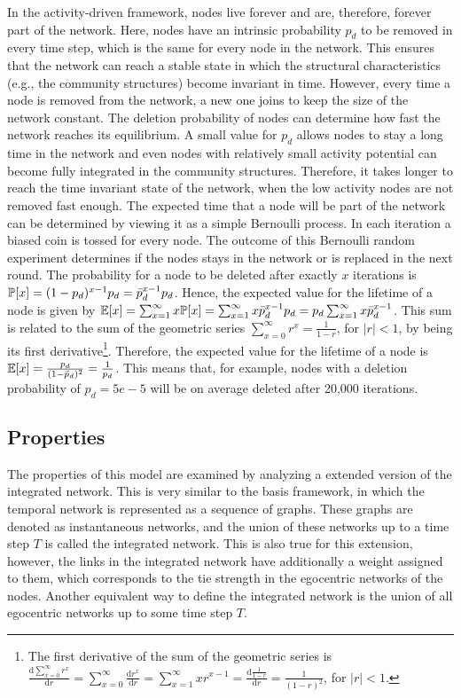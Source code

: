 In the activity-driven framework, nodes live forever and are, therefore, forever part of the network.
Here, nodes have an intrinsic probability \(p_{d}\) to be removed in every time step, which is the same for every node in the network.
This ensures that the network can reach a stable state in which the structural characteristics (e.g., the community structures) become invariant in time.
However, every time a node is removed from the network, a new one joins to keep the size of the network constant.
The deletion probability of nodes can determine how fast the network reaches its equilibrium.
A small value for \(p_{d}\) allows nodes to stay a long time in the network and even nodes with relatively small activity potential can become fully integrated in the community structures.
Therefore, it takes longer to reach the time invariant state of the network, when the low activity nodes are not removed fast enough.
The expected time that a node will be part of the network can be determined by viewing it as a simple Bernoulli process.
In each iteration a biased coin is tossed for every node.
The outcome of this Bernoulli random experiment determines if the nodes stays in the network or is replaced in the next round.
The probability for a node to be deleted after exactly \( x \) iterations is \( \mathbb{P}[{x}] = (1-p_{d})^{x-1} p_{d} = \bar{p}_{d}^{x-1} p_{d}\).
Hence, the expected value for the lifetime of a node is given by \( \mathbb{E}[{x}] = \sum_{x=1}^{\infty} x \mathbb{P}[{x}] = \sum_{x=1}^{\infty} x \bar{p}_{d}^{x-1} p_{d} = p_{d} \sum_{x=1}^{\infty} x \bar{p}_{d}^{x-1} \).
This sum is related to the sum of the geometric series \( \sum_{x=0}^{\infty} r^{x} = \frac{1}{1 - r} \), for \(|r| < 1 \), by being its first derivative\footnote{The first derivative of the sum of the geometric series is \( \frac{\mathrm{d} \sum_{x=0}^{\infty} r^{x}}{\mathrm{d} r} = \sum_{x=0}^{\infty} \frac{\mathrm{d} r^{x}}{\mathrm{d} r} = \sum_{x=1}^{\infty} x r^{x-1} = \frac{\mathrm{d} \frac{1}{1-r}}{\mathrm{d} r} = \frac{1}{(1 - r)^{2}} \), for \(|r| < 1\).}.
Therefore, the expected value for the lifetime of a node is \( \mathbb{E}[{x}] = \frac{p_{d}}{(1 - \bar{p}_{d})^{2}} = \frac{1}{p_{d}} \).
This means that, for example, nodes with a deletion probability of \(p_{d} = 5e-5\) will be on average deleted after 20,000 iterations.


\subsection{Properties}

The properties of this model are examined by analyzing a extended version of the integrated network.
This is very similar to the basis framework, in which the temporal network is represented as a sequence of graphs.
These graphs are denoted as instantaneous networks, and the union of these networks up to a time step \( T \) is called the integrated network.
This is also true for this extension, however, the links in the integrated network have additionally a weight assigned to them, which corresponds to the tie strength in the egocentric networks of the nodes.
Another equivalent way to define the integrated network is the union of all egocentric networks up to some time step \( T \).

